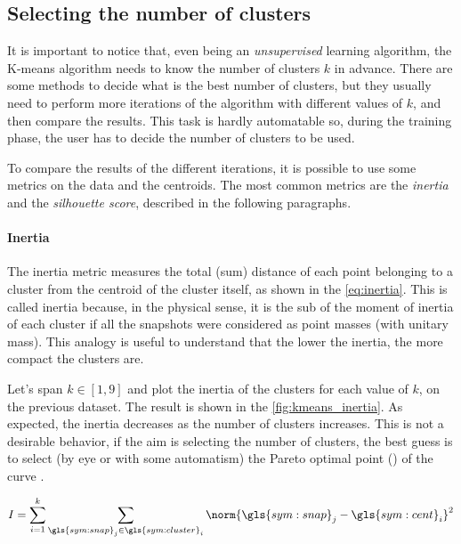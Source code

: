 \subsection{Selecting the number of clusters}
It is important to notice that, even being an \emph{unsupervised} learning algorithm, the K-means algorithm needs to know the number of clusters $k$ in advance. There are some methods to decide what is the best number of clusters, but they usually need to perform more iterations of the algorithm with different values of $k$, and then compare the results. This task is hardly automatable so, during the training phase, the user has to decide the number of clusters to be used.

To compare the results of the different iterations, it is possible to use some metrics on the data and the centroids. The most common metrics are the \emph{inertia} and the \emph{silhouette score}, described in the following paragraphs.

\paragraph*{Inertia}
The inertia metric measures the total (sum) distance of each point belonging to a cluster from the centroid of the cluster itself, as shown in the \autoref{eq:inertia}. This is called inertia because, in the physical sense, it is the sub of the moment of inertia of each cluster if all the snapshots were considered as point masses (with unitary mass). This analogy is useful to understand that the lower the inertia, the more compact the clusters are.

Let's span $k \in [1,9]$ and plot the inertia of the clusters for each value of $k$, on the previous dataset. The result is shown in the \autoref{fig:kmeans_inertia}. As expected, the inertia decreases as the number of clusters increases. This is not a desirable behavior, if the aim is selecting the number of clusters, the best guess is to select (by eye or with some automatism) the Pareto optimal point () of the curve \cite{pareto}. 

\begin{equation}
  \label{eq:inertia}
  I = \sum_{i=1}^{k}\sum_{\gls{sym:snap}_j \in \gls{sym:cluster}_i} \norm{\gls{sym:snap}_j - \gls{sym:cent}_i}^2
\end{equation}

